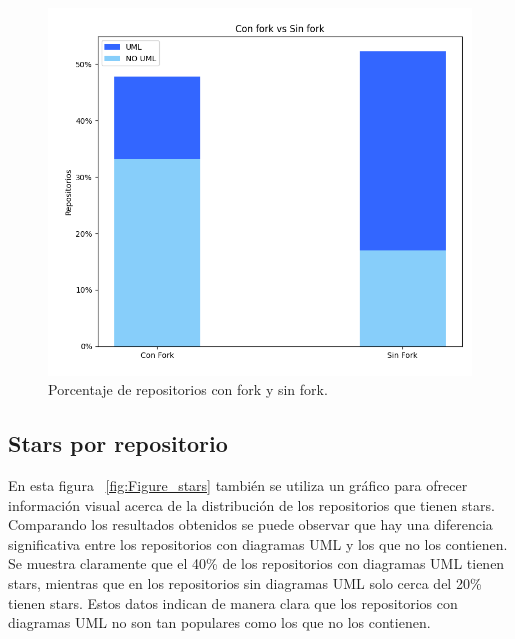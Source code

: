 \documentclass[a4paper, 12pt]{book}
\begin{document}
\begin{figure}
  \centering
  \includegraphics[width=12cm, keepaspectratio]{img/Figure_fork.png}
  \caption{Porcentaje de repositorios con fork y sin fork.}\label{fig:Figure_fork}
\end{figure}


\subsection{Stars por repositorio}
\label{sec:Gráfico de barras de los stars por repositorio}
En esta figura ~\ref{fig:Figure_stars} también se utiliza un gráfico para ofrecer información visual acerca de la distribución de los repositorios que tienen stars. 
Comparando los resultados obtenidos se puede observar que hay una diferencia significativa entre los repositorios con diagramas UML y los que no los contienen.
Se muestra claramente que el 40\% de los repositorios con diagramas UML tienen stars, mientras que en los repositorios sin diagramas UML solo cerca del 20\% tienen stars.
Estos datos indican de manera clara que los repositorios con diagramas UML no son tan populares como los que no los contienen.
\end{document}
